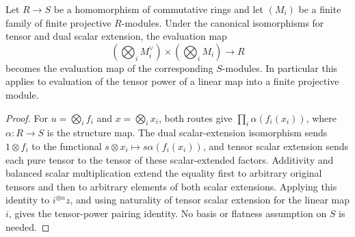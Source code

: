 \begin{lemma}
\label{lem:tensor-evaluation-base-change}
\leanok
Let $R\to S$ be a homomorphism of commutative rings and let $(M_i)$
be a finite family of finite projective $R$-modules. Under the canonical
isomorphisms for tensor and dual scalar extension, the evaluation map
\[
 (\bigotimes_i M_i^\vee)\times(\bigotimes_i M_i)\longrightarrow R
\]
becomes the evaluation map of the corresponding $S$-modules. In
particular this applies to evaluation of the tensor power of a linear
map into a finite projective module.
\end{lemma}
\begin{proof}
For $u=\bigotimes_i f_i$ and $x=\bigotimes_i x_i$, both routes give
$\prod_i \alpha(f_i(x_i))$, where $\alpha:R\to S$ is the structure
map. The dual scalar-extension isomorphism sends $1\otimes f_i$
to the functional $s\otimes x_i\mapsto s\alpha(f_i(x_i))$, and
tensor scalar extension sends each pure tensor to the tensor of these
scalar-extended factors. Additivity and balanced scalar multiplication
extend the equality first to arbitrary original tensors and then to
arbitrary elements of both scalar extensions. Applying this identity
to $i^{\otimes n}z$, and using naturality of tensor scalar extension
for the linear map $i$, gives the tensor-power pairing identity.
No basis or flatness assumption on $S$ is needed.
\end{proof}

